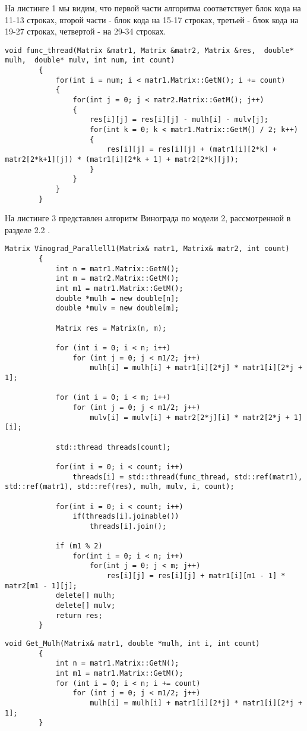 \documentclass[a4paper, 14pt]{article}
\begin{document}
		На листинге 1 мы видим, что первой части алгоритма соответствует блок кода на 11-13 строках, второй части - блок кода на 15-17 строках, третьей - блок кода на 19-27 строках, четвертой - на 29-34 строках.
		
		\begin{lstlisting}[label=some-code,caption=Этап 3(тройной цикл) в алгоритме Винограда]
		void func_thread(Matrix &matr1, Matrix &matr2, Matrix &res,  double* mulh,  double* mulv, int num, int count)
		{
			for(int i = num; i < matr1.Matrix::GetN(); i += count)
			{
				for(int j = 0; j < matr2.Matrix::GetM(); j++)
				{
					res[i][j] = res[i][j] - mulh[i] - mulv[j];
					for(int k = 0; k < matr1.Matrix::GetM() / 2; k++)
					{
						res[i][j] = res[i][j] + (matr1[i][2*k] + matr2[2*k+1][j]) * (matr1[i][2*k + 1] + matr2[2*k][j]);
					}
				}
			}
		}
		\end{lstlisting}

	\newpage
		На листинге 3 представлен алгоритм Винограда по модели 2, рассмотренной в разделе 2.2 .
		\begin{lstlisting}[label=some-code,caption=Алгоритм Винограда по модели 1]
		Matrix Vinograd_Parallell1(Matrix& matr1, Matrix& matr2, int count)
		{
			int n = matr1.Matrix::GetN();
			int m = matr2.Matrix::GetM();
			int m1 = matr1.Matrix::GetM();
			double *mulh = new double[n];
			double *mulv = new double[m];

			Matrix res = Matrix(n, m);

			for (int i = 0; i < n; i++)
				for (int j = 0; j < m1/2; j++)
					mulh[i] = mulh[i] + matr1[i][2*j] * matr1[i][2*j + 1];

			for (int i = 0; i < m; i++)
				for (int j = 0; j < m1/2; j++)
					mulv[i] = mulv[i] + matr2[2*j][i] * matr2[2*j + 1][i];

			std::thread threads[count];

			for(int i = 0; i < count; i++)
				threads[i] = std::thread(func_thread, std::ref(matr1), std::ref(matr1), std::ref(res), mulh, mulv, i, count);

			for(int i = 0; i < count; i++)
				if(threads[i].joinable())
					threads[i].join();

			if (m1 % 2)
				for(int i = 0; i < n; i++)
					for(int j = 0; j < m; j++)
						res[i][j] = res[i][j] + matr1[i][m1 - 1] * matr2[m1 - 1][j];
			delete[] mulh;
			delete[] mulv;
			return res;
		}
		\end{lstlisting}
		
		\begin{lstlisting}[label=some-code,caption=Этап 1(вычисление mulh) в алгоритме Винограда]
		void Get_Mulh(Matrix& matr1, double *mulh, int i, int count)
		{
			int n = matr1.Matrix::GetN();
			int m1 = matr1.Matrix::GetM();
			for (int i = 0; i < n; i += count)
				for (int j = 0; j < m1/2; j++)
					mulh[i] = mulh[i] + matr1[i][2*j] * matr1[i][2*j + 1];
		}
		\end{lstlisting}
\end{document}
